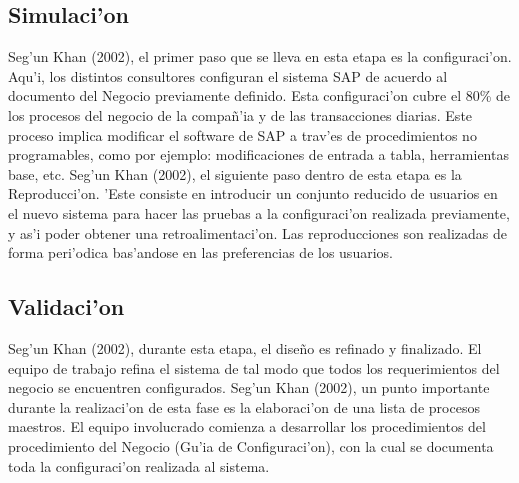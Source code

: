 \subsection{Simulaci'on}
	Seg'un Khan (2002), el primer paso que se lleva en esta etapa es la configuraci'on. Aqu'i, los distintos consultores configuran el sistema SAP de acuerdo al documento del Negocio previamente definido.  Esta configuraci'on cubre el 80\% de los procesos del negocio de la compa\~n'ia y de las transacciones diarias. Este proceso implica modificar el software de SAP a trav'es de procedimientos no programables, como por ejemplo:  modificaciones de entrada a tabla, herramientas base, etc.
\newline
\newline
\indent Seg'un Khan (2002), el siguiente paso dentro de esta etapa es la Reproducci'on. 'Este consiste en introducir un conjunto reducido de usuarios en el nuevo sistema para hacer las pruebas a la configuraci'on realizada previamente, y as'i poder obtener una retroalimentaci'on. Las reproducciones son realizadas de forma peri'odica bas'andose en las preferencias de los usuarios. 
	
\subsection{Validaci'on}
	Seg'un Khan (2002), durante esta etapa, el dise\~no es refinado y finalizado. El equipo de trabajo refina el sistema de tal modo que todos los requerimientos del negocio se encuentren configurados. 
	Seg'un Khan (2002), un punto importante durante la realizaci'on de esta fase es la elaboraci'on de una lista de procesos maestros. 	El equipo involucrado comienza a desarrollar los procedimientos del procedimiento del Negocio (Gu'ia de Configuraci'on), con la cual se documenta toda la configuraci'on realizada al sistema. 
